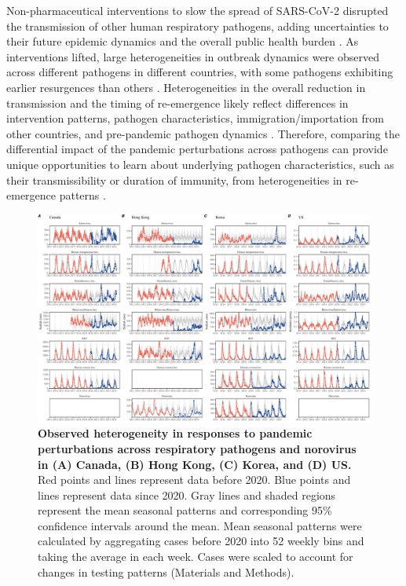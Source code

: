 \documentclass[12pt]{article}
\begin{document}
Non-pharmaceutical interventions to slow the spread of SARS-CoV-2 disrupted the transmission of other human respiratory pathogens, adding uncertainties to their future epidemic dynamics and the overall public health burden \citep{baker2020impact}.
As interventions lifted, large heterogeneities in outbreak dynamics were observed across different pathogens in different countries, with some pathogens exhibiting earlier resurgences than others \citep{gomez2021uncertain,koltai2022determinants,park2024predicting}.
Heterogeneities in the overall reduction in transmission and the timing of re-emergence likely reflect differences in intervention patterns, pathogen characteristics, immigration/importation from other countries, and pre-pandemic pathogen dynamics \citep{perofsky2024impacts}.
Therefore, comparing the differential impact of the pandemic perturbations across pathogens can provide unique opportunities to learn about underlying pathogen characteristics, such as their transmissibility or duration of immunity, from heterogeneities in re-emergence patterns \citep{chow2023effects}.

\begin{figure}[!th]
\includegraphics[width=\textwidth]{../figure1/figure1.pdf}
\caption{
\textbf{Observed heterogeneity in responses to pandemic perturbations across respiratory pathogens and norovirus in (A) Canada, (B) Hong Kong, (C) Korea, and (D) US.}
Red points and lines represent data before 2020.
Blue points and lines represent data since 2020.
Gray lines and shaded regions represent the mean seasonal patterns and corresponding 95\% confidence intervals around the mean.
Mean seasonal patterns were calculated by aggregating cases before 2020 into 52 weekly bins and taking the average in each week.
Cases were scaled to account for changes in testing patterns (Materials and Methods).
}
\end{figure} 
\end{document}

